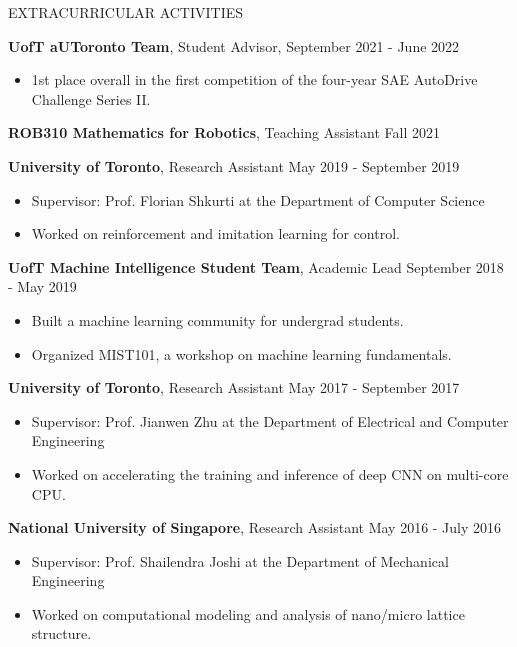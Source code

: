 \documentclass{cv}
\begin{document}
\begin{rSection}{EXTRACURRICULAR ACTIVITIES}
  \item \textbf{UofT aUToronto Team}, Student Advisor,  \hfill September 2021 - June 2022
  \vspace{-0.25em}
  \begin{itemize}[noitemsep,topsep=0pt]
    \item 1st place overall in the first competition of the four-year SAE AutoDrive Challenge Series II.
  \end{itemize}
  \item \textbf{ROB310 Mathematics for Robotics}, Teaching Assistant \hfill Fall 2021
  \item \textbf{University of Toronto}, Research Assistant \hfill May 2019 - September 2019
  \vspace{-0.25em}
  \begin{itemize}[noitemsep,topsep=0pt]
    \item Supervisor: Prof. Florian Shkurti at the Department of Computer Science
    \item Worked on reinforcement and imitation learning for control.
  \end{itemize}
  \item \textbf{UofT Machine Intelligence Student Team}, Academic Lead \hfill September 2018 - May 2019
  \vspace{-0.25em}
  \begin{itemize}[noitemsep,topsep=0pt]
    \item Built a machine learning community for undergrad students.
    \item Organized MIST101, a workshop on machine learning fundamentals.
  \end{itemize}
  \item \textbf{University of Toronto}, Research Assistant \hfill May 2017 - September 2017
  \vspace{-0.25em}
  \begin{itemize}[noitemsep,topsep=0pt]
    \item Supervisor: Prof. Jianwen Zhu at the Department of Electrical and Computer Engineering
    \item Worked on accelerating the training and inference of deep CNN on multi-core CPU.
  \end{itemize}
  \item \textbf{National University of Singapore}, Research Assistant \hfill May 2016 - July 2016
  \vspace{-0.25em}
  \begin{itemize}[noitemsep,topsep=0pt]
    \item Supervisor: Prof. Shailendra Joshi at the Department of Mechanical Engineering
    \item Worked on computational modeling and analysis of nano/micro lattice structure.
  \end{itemize}
\end{rSection}
\end{document}
